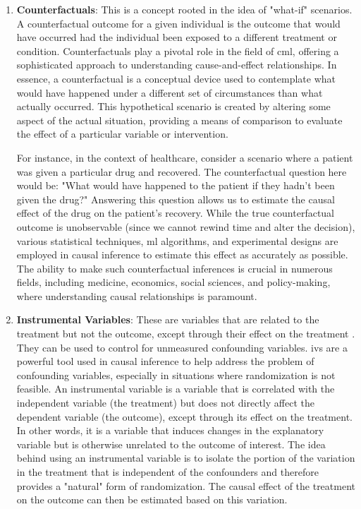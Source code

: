 \begin{enumerate}
    \item \textbf{Counterfactuals}: This is a concept rooted in the idea of "what-if" scenarios. A counterfactual outcome for a given individual is the outcome that would have occurred had the individual been exposed to a different treatment or condition.
    Counterfactuals play a pivotal role in the field of \ac{cml}, offering a sophisticated approach to understanding cause-and-effect relationships. In essence, a counterfactual is a conceptual device used to contemplate what would have happened under a different set of circumstances than what actually occurred. This hypothetical scenario is created by altering some aspect of the actual situation, providing a means of comparison to evaluate the effect of a particular variable or intervention.

    For instance, in the context of healthcare, consider a scenario where a patient was given a particular drug and recovered. The counterfactual question here would be: "What would have happened to the patient if they hadn't been given the drug?" Answering this question allows us to estimate the causal effect of the drug on the patient's recovery. While the true counterfactual outcome is unobservable (since we cannot rewind time and alter the decision), various statistical techniques, \ac{ml} algorithms, and experimental designs are employed in causal inference to estimate this effect as accurately as possible. The ability to make such counterfactual inferences is crucial in numerous fields, including medicine, economics, social sciences, and policy-making, where understanding causal relationships is paramount.
    
    \item \textbf{Instrumental Variables}: These are variables that are related to the treatment but not the outcome, except through their effect on the treatment \cite{burgessImprovingBiasCoverage2012,daviesIssuesReportingConduct2013}. They can be used to control for unmeasured confounding variables. \Acp{iv} are a powerful tool used in causal inference to help address the problem of confounding variables, especially in situations where randomization is not feasible. An instrumental variable is a variable that is correlated with the independent variable (the treatment) but does not directly affect the dependent variable (the outcome), except through its effect on the treatment. In other words, it is a variable that induces changes in the explanatory variable but is otherwise unrelated to the outcome of interest. The idea behind using an instrumental variable is to isolate the portion of the variation in the treatment that is independent of the confounders and therefore provides a "natural" form of randomization. The causal effect of the treatment on the outcome can then be estimated based on this variation.
    

\end{enumerate}
